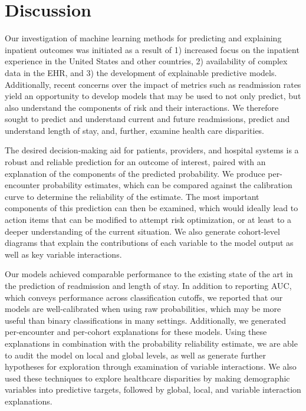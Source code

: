\section{Discussion}
Our investigation of machine learning methods for 
predicting and explaining inpatient outcomes
was initiated as a result of 
1) increased focus on the inpatient experience in the United States and other countries, 
2) availability of complex data in the EHR,
and 3) the development of explainable predictive models.\@
Additionally, recent concerns over the impact of metrics such as 
readmission rates yield an opportunity to develop models that may be used to 
not only predict, but also understand the components of risk and their interactions.\supercite{Wadhera2018}
We therefore sought to predict and understand current and future readmissions, predict and understand length of stay,
and, further, examine health care disparities.\@ 

The desired decision-making aid for patients, providers, and hospital systems
is a robust and reliable prediction for an outcome of interest,
paired with an explanation of the components of the predicted probability.\@
We produce per-encounter probability estimates, which can be compared against the calibration curve
to determine the reliability of the estimate. The most important components
of this prediction can then be examined, which would ideally lead to 
action items that can be modified to attempt risk optimization,\supercite{Donze2013, Leppin2014, Burke2017, Auerbach2016}
or at least to a deeper understanding of the current situation.\supercite{Saunders2015}
We also generate cohort-level diagrams that explain the 
contributions of each variable to the model output
as well as key variable interactions.\@

Our models achieved comparable performance to the existing state of the art 
in the prediction of readmission and length of stay.\supercite{Rajkomar2018, Aubert2017, Artetxe2018}\@
In addition to reporting AUC, which conveys performance across classification cutoffs,
we reported that our models are well-calibrated when using raw probabilities, 
which may be more useful than binary classifications in many settings.\supercite{Steyerberg2010}
Additionally, we generated per-encounter and per-cohort explanations for these models.
Using these explanations in combination with the probability reliability estimate, 
we are able to audit the model on local and global levels, 
as well as generate further hypotheses for exploration through examination of 
variable interactions.\@
We also used these techniques to explore healthcare disparities 
by making demographic variables into predictive targets, 
followed by global, local, and variable interaction explanations.\@
{}

